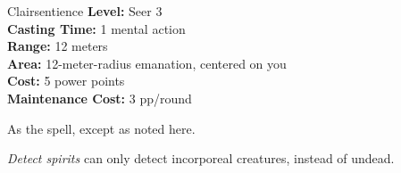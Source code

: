 {Clairsentience}
{
	\textbf{Level:}
	Seer 3\\
	\textbf{Casting Time:}
	1 mental action\\
	\textbf{Range:}
	12 meters\\
	\textbf{Area:}
	12-meter-radius emanation, centered on you\\
	\textbf{Cost:}
	5 power points\\
	\textbf{Maintenance Cost:}
	3 pp/round\\
}
{
	As the  spell, except as noted here.

	\emph{Detect spirits} can only detect incorporeal creatures, instead of undead.
}